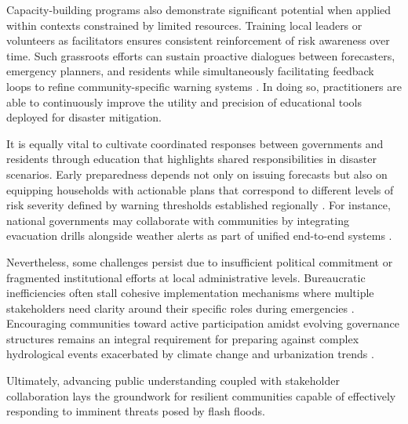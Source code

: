 Capacity-building programs also demonstrate significant potential when applied within contexts constrained by limited resources. Training local leaders or volunteers as facilitators ensures consistent reinforcement of risk awareness over time. Such grassroots efforts can sustain proactive dialogues between forecasters, emergency planners, and residents while simultaneously facilitating feedback loops to refine community-specific warning systems \citep{Georgakakos2022}. In doing so, practitioners are able to continuously improve the utility and precision of educational tools deployed for disaster mitigation.

It is equally vital to cultivate coordinated responses between governments and residents through education that highlights shared responsibilities in disaster scenarios. Early preparedness depends not only on issuing forecasts but also on equipping households with actionable plans that correspond to different levels of risk severity defined by warning thresholds established regionally \citep{Jubach2016}\citep{Msigwa2024}. For instance, national governments may collaborate with communities by integrating evacuation drills alongside weather alerts as part of unified end-to-end systems \citep{Jubach2016}.

Nevertheless, some challenges persist due to insufficient political commitment or fragmented institutional efforts at local administrative levels. Bureaucratic inefficiencies often stall cohesive implementation mechanisms where multiple stakeholders need clarity around their specific roles during emergencies \citep{Msigwa2024}\citep{Jubach2016}. Encouraging communities toward active participation amidst evolving governance structures remains an integral requirement for preparing against complex hydrological events exacerbated by climate change and urbanization trends \citep{Abegaz2024}\citep{Msigwa2024}.

Ultimately, advancing public understanding coupled with stakeholder collaboration lays the groundwork for resilient communities capable of effectively responding to imminent threats posed by flash floods.


